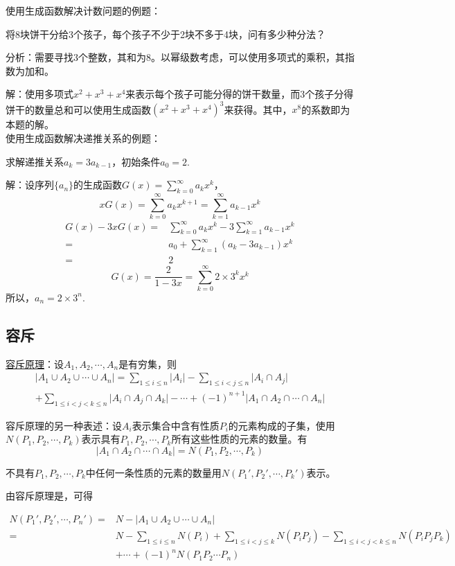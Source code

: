 使用生成函数解决计数问题的例题：

将8块饼干分给3个孩子，每个孩子不少于2块不多于4块，问有多少种分法？

分析：需要寻找3个整数，其和为8。以幂级数考虑，可以使用多项式的乘积，其指数为加和。

解：使用多项式$x^2 + x^3 + x^4$来表示每个孩子可能分得的饼干数量，而3个孩子分得饼干的数量总和可以使用生成函数$(x^2 + x^3 + x^4)^3$来获得。其中，$x^8$的系数即为本题的解。\\

使用生成函数解决递推关系的例题：

求解递推关系$a_k = 3 a_{k-1}$，初始条件$a_0 = 2$.

解：设序列$\{a_n\}$的生成函数$G(x) = \displaystyle \sum _{k=0}^\infty a_k x^k$，
\[xG(x) = \sum _{k=0}^\infty a_k x^{k+1} = \sum _{k=1}^\infty a_{k-1} x^k\]
\begin{align*}
    G(x) - 3xG(x) =& \sum _{k=0}^\infty a_k x^k - 3\sum _{k=1}^\infty a_{k-1} x^k\\
    =& a_0 + \sum _{k=1}^\infty (a_k - 3 a_{k-1}) x^k \\
    =& 2
\end{align*}
\[G(x) = \frac {2}{1-3x} = \sum _{k=0}^\infty 2 \times 3^k x^k\]
所以，$a_n = 2 \times 3^n$.

\subsection{容斥}
\uline {容斥原理}：设$A_1, A_2, \cdots, A_n$是有穷集，则
\begin{multline*}
    \lvert A_1 \cup A_2 \cup \cdots \cup A_n \rvert = \sum _{1 \le i \le n} \lvert A_i \rvert - \sum _{1 \le i < j \le n} \lvert A_i \cap A_j \rvert \\
    + \sum _{1\le i < j < k \le n} \lvert A_i \cap A_j \cap A_k \rvert - \cdots + (-1)^{n+1} \lvert A_1 \cap A_2 \cap \cdots \cap A_n \rvert
\end{multline*}

容斥原理的另一种表述：设$A_i$表示集合中含有性质$P_i$的元素构成的子集，使用$N(P_1, P_2, \cdots, P_k)$表示具有$P_1, P_2, \cdots, P_k$所有这些性质的元素的数量。有
\[\lvert A_1 \cap A_2 \cap \cdots \cap A_k \rvert = N(P_1, P_2, \cdots, P_k)\]

不具有$P_1, P_2, \cdots, P_k$中任何一条性质的元素的数量用$N(P_1', P_2', \cdots, P_k')$表示。

由容斥原理是，可得

\begin{align*}
    N(P_1', P_2', \cdots, P_n') =& N - \lvert A_1 \cup A_2 \cup \cdots \cup A_n \rvert \\
    =& N - \sum _{1 \le i \le n} N(P_i) + \sum _{1 \le i < j \le k} N(P_i P_j) - \sum _{1 \le i < j < k \le n} N(P_i P_j P_k)\\
    &+ \cdots + (-1)^n N(P_1 P_2 \cdots P_n)
\end{align*}

